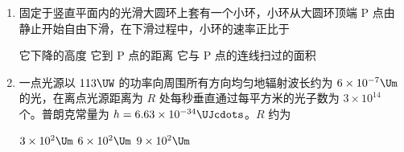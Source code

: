\documentclass[\gkver]{gaokaozhenti}
\begin{document}
\begin{enumerate}
{设绳子拉力为 $T$，水平方向有 $2T\cos\theta=F$

解得 $T=\frac{5}{8}F$

对任意小球由牛顿第二定律可得：$T=ma$

解得：$a=\frac{5F}{8m}$

故 A 正确，BCD 错误。

故选 A。
}

\item
固定于竖直平面内的光滑大圆环上套有一个小环，小环从大圆环顶端 P 点由静止开始自由下滑，在下滑过程中，小环的速率正比于

\onepicture[h=4.24cm]{}

{它下降的高度}
{它到 P 点的距离}
{它与 P 点的连线扫过的面积}


\item
一点光源以 $113\UW$ 的功率向周围所有方向均匀地辐射波长约为 $6\times10^{-7}\Um$ 的光，在离点光源距离为 $R$ 处每秒垂直通过每平方米的光子数为 $3\times10^{14}$ 个。普朗克常量为 $h = 6.63\times10^{-34}\UJcdots$。$R$ 约为

{$3\times10^{2}\Um$}
{$6\times10^{2}\Um$}
{$9\times10^{2}\Um$}

\end{enumerate}
\end{document}
